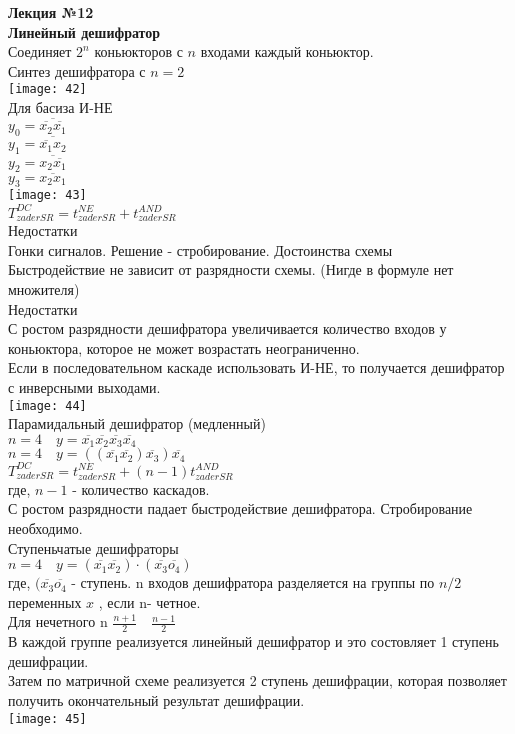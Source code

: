 \LARGE{ \textbf {Лекция №12}}\\
\Large{ \textbf {Линейный дешифратор}}\\
Соединяет $ 2^n $ коньюкторов с $ n $ входами каждый коньюктор.\\
Синтез дешифратора с $ n = 2 $\\
\texttt{[image: 42]}\\
Для басиза И-НЕ\\
$ y_0 = \overline{ \overline{x_2} \overline{x_1}} $ \\
$ y_1 = \overline{ \overline{x_1} x_2}$\\
$ y_2 = \overline{ x_2 \overline{x_1}} $\\
$ y_3 =\overline{ x_2 x_1} $\\

\texttt{[image: 43]}\\
$T^{DC}_{zaderSR}= t_{zaderSR}^{NE} + t_{zaderSR}^{AND} $ \\
Недостатки\\
Гонки сигналов. Решение - стробирование.
Достоинства схемы\\
Быстродействие не зависит от разрядности схемы. (Нигде в формуле нет множителя)\\
Недостатки\\
С ростом разрядности дешифратора увеличивается количество входов у коньюктора, которое не может возрастать неограниченно.\\

Если в последовательном каскаде использовать И-НЕ, то получается дешифратор с инверсными выходами.\\
\texttt{[image: 44]}\\

Парамидальный дешифратор (медленный)\\
$ n = 4 \quad y = \overline{x_1} \overline{x_2} \overline{x_3} \overline{x_4} $\\
$ n = 4 \quad y = ((\overline{x_1} \overline{x_2}) \overline{x_3}) \overline{x_4} $\\
$T^{DC}_{zaderSR}= t_{zaderSR}^{NE} + (n-1) t_{zaderSR}^{AND} $ \\
где, $ n-1  $ - количество каскадов.\\
С ростом разрядности  падает быстродействие дешифратора. Стробирование необходимо.\\

Ступеньчатые дешифраторы \\
$ n = 4 \quad y = (\overline{x_1} \overline{x_2}) \cdot (\overline{x_3} \overline{o_4}) $\\
где, $  (\overline{x_3} \overline{o_4}  $ - ступень.
n входов дешифратора разделяется на  группы по $ n/2  $  переменных $ x$ , если n- четное.\\
Для нечетного n  $ \frac{n+1}{2} \quad \frac{n-1}{2} $\\
В каждой группе реализуется линейный дешифратор и это состовляет 1 ступень дешифрации.\\
Затем по матричной схеме реализуется 2 ступень дешифрации, которая позволяет получить окончательный результат дешифрации.\\
\texttt{[image: 45]}\\

